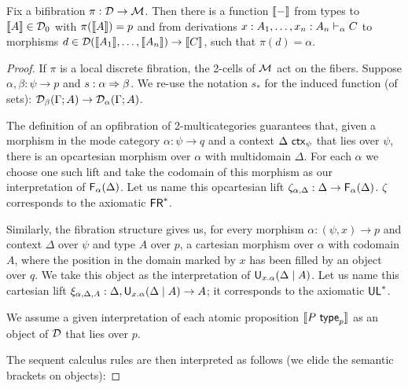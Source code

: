 \begin{theorem}
Fix a bifibration $\pi : \mathcal{D} \to \mathcal{M}$.  Then there is a function $\llbracket -
\rrbracket$ from types  to $\llbracket A \rrbracket \in \mathcal{D}_0$ with $\pi(\llbracket
A \rrbracket) = p$ and from derivations $x:A_1, \ldots,
  x_n:A_n \vdash_{\alpha} C$ to morphisms $d \in \mathcal{D}(\llbracket A_1 \rrbracket, \dots, \llbracket
A_n \rrbracket) \to \llbracket C \rrbracket$, such that $\pi(d) = \alpha$.
\end{theorem}

\begin{proof}
If $\pi$ is a local discrete fibration, the 2-cells of $\mathcal{M}$ act on the
fibers. Suppose $\alpha, \beta : \psi \to p$ and $s : \alpha \Rightarrow
\beta$. We re-use the notation $s_*$ for the induced function (of sets):
$\mathcal{D}_\beta(\Gamma; A) \to \mathcal{D}_\alpha(\Gamma; A)$.  

The definition of an opfibration of 2-multicategories guarantees that,
given a morphism in the mode category $\alpha : \psi \to q$ and a
context $\Delta \,\, \mathsf{ctx}_{\psi}$ that lies over $\psi$, there is an
opcartesian morphism over $\alpha$ with multidomain $\Delta$. For each
$\alpha$ we choose one such lift and take the codomain of this morphism
as our interpretation of $\mathsf{F}_{\alpha}(\Delta)$. Let us name this
opcartesian lift $\zeta_{\alpha, \Delta} : \Delta \to
\mathsf{F}_{\alpha}(\Delta)$. $\zeta$ corresponds to the axiomatic $\mathsf{FR}^*$.

Similarly, the fibration structure gives us, for every morphism $\alpha
: (\psi,x) \to p$ and context $\Delta$ over $\psi$ and type $A$ over
$p$, a cartesian morphism over $\alpha$ with codomain $A$, where the
position in the domain marked by $x$ has been filled by an object over
$q$. We take this object as the interpretation of
$\mathsf{U}_{x.\alpha}(\Delta \mid A)$.  Let us name this cartesian lift
$\xi_{\alpha, \Delta,A} : \Delta,\mathsf{U}_{x.\alpha}(\Delta \mid A) \to A$; it
corresponds to the axiomatic $\mathsf{UL}^*$.  

We assume a given interpretation of each atomic proposition $\llbracket
P \,\, \mathsf{type}_{p} \rrbracket$ as an object of $\mathcal{D}$ that lies over $p$.

The sequent calculus rules are then interpreted as follows (we elide the
semantic brackets on objects):


\end{proof}
